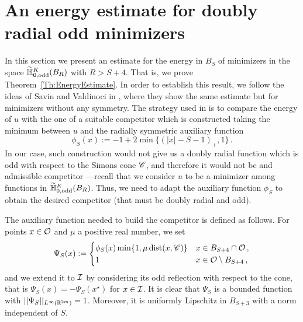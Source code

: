 \section{An energy estimate for doubly radial odd minimizers}
\label{Sec:EnergyEstimate}

In this section we present an estimate for the energy in $B_S$ of minimizers in the space $\widetilde{\mathbb{H}}^K_{0, \mathrm{odd}}(B_R)$ with $R > S+ 4$. That is, we prove Theorem~\ref{Th:EnergyEstimate}. In order to establish this result, we follow the ideas of Savin and Valdinoci in \cite{SavinValdinoci-EnergyEstimate}, where they show the same estimate but for minimizers without any symmetry. The strategy used in \cite{SavinValdinoci-EnergyEstimate} is to compare the energy of $u$ with the one of a suitable competitor which is constructed taking the minimum between $u$ and the radially symmetric auxiliary function
\begin{equation}
	\label{Eq:DefPhiS}
	\phi_S (x) :=-1+2\min\{(|x|-S-1)_+,1\}\,.
\end{equation}
In our case, such construction would not give us a doubly radial function which is odd with respect to the Simons cone $\mathscr{C}$, and therefore it would not be and admissible competitor ---recall that we consider $u$ to be a minimizer among functions in $\widetilde{\mathbb{H}}^K_{0, \mathrm{odd}}(B_R)$. Thus, we need to adapt the auxiliary function $\phi_S$ to obtain the desired  competitor (that must be doubly radial and odd).

The auxiliary function needed to build the competitor is defined as follows. For points $x\in \mathcal{O}$ and $\mu$ a positive real number, we set
\begin{equation}
	\label{Eq:DefPsiS}
\Psi_S(x) := 
\begin{cases}
\phi_S (x) \min \{1,\mu\operatorname{dist}(x,\mathscr{C})\} &  x \in B_{S+4}\cap \mathcal{O}\,, \\
1 &  x \in \mathcal{O} \setminus B_{S+4}\,,
\end{cases}
\end{equation}
and we extend it to $\mathcal{I}$ by considering its odd reflection with respect to the cone, that is $\Psi_S(x) = -\Psi_S(x^\star)$ for $x\in \mathcal{I}$. It is clear that $\Psi_S$ is a bounded function with $||\Psi_S||_{L^\infty(\mathbb{R}^{2m})}=1$. Moreover, it is uniformly Lipschitz in $\overline{B_{S+3}}$ with a norm independent of $S$.

